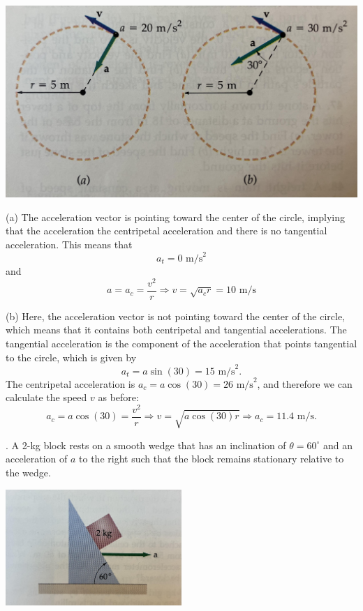 \documentclass[11pt,letterpaper]{article}
\newcommand{\sol}[1]{{\color{NavyBlue} #1}}
\begin{document}
\includegraphics[width=\textwidth]{exam1_2.jpg}

\sol{(a) The acceleration vector is pointing toward the center of the circle, implying that the acceleration the centripetal acceleration and there is no tangential acceleration. This means that
\begin{equation}
\boxed{a_t = 0\mbox{ m/s}^2}
\end{equation}
and 
\begin{equation}
a = a_c = \frac{v^2}{r} \Rightarrow \boxed{v=\sqrt{a_cr}=10\mbox{ m/s}}
\end{equation}

(b) Here, the acceleration vector is not pointing toward the center of the circle, which means that it contains both centripetal and tangential accelerations. The tangential acceleration is the component of the acceleration that points tangential to the circle, which is given by
\begin{equation}
\boxed{a_t = a\sin(30) = 15\mbox{ m/s}^2}.
\end{equation}
The centripetal acceleration is $a_c=a\cos(30) = 26\mbox{ m/s}^2$, and therefore we can calculate the speed $v$ as before:
\begin{equation}
a_c = a\cos(30) = \frac{v^2}{r} \Rightarrow v = \sqrt{a\cos(30)r} \Rightarrow \boxed{a_c= 11.4\mbox{ m/s}}.
\end{equation}



}

. A 2-kg block rests on a smooth wedge that has an inclination of $\theta=60^\circ$ and an acceleration of $a$ to the right such that the block remains stationary relative to the wedge. 

\includegraphics[width=0.5\textwidth]{./exam1_3.jpg}
\end{document}
